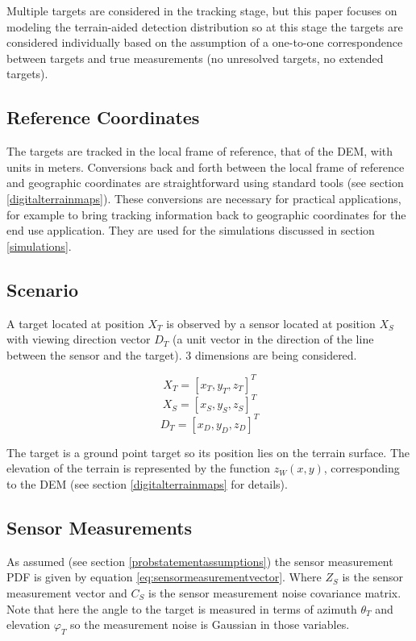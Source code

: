 \documentclass[journal]{IEEEtran}
\begin{document}
Multiple targets are considered in the tracking stage, but this paper focuses on modeling the terrain-aided detection distribution so at this stage the targets are considered individually based on the assumption of a one-to-one correspondence between targets and true measurements (no unresolved targets, no extended targets).

\subsection{Reference Coordinates}
The targets are tracked in the local frame of reference, that of the DEM, with units in meters. Conversions back and forth between the local frame of reference and geographic coordinates are straightforward using standard tools (see section \ref{digitalterrainmaps}). These conversions are necessary for practical applications, for example to bring tracking information back to geographic coordinates for the end use application. They are used for the simulations discussed in section \ref{simulations}.

\subsection{Scenario}
A target located at position $X_T$ is observed by a sensor located at position $X_S$ with viewing direction vector $D_T$ (a unit vector in the direction of the line between the sensor and the target). 3 dimensions are being considered.

\begin{dmath}
    X_T = [x_T, y_T, z_T]^T
\end{dmath}
\begin{dmath}
    X_S = [x_S, y_S, z_S]^T
\end{dmath}
\begin{dmath}
    D_T = [x_D, y_D, z_D]^T
\end{dmath}

The target is a ground point target so its position lies on the terrain surface. The elevation of the terrain is represented by the function $z_{W}(x,y)$, corresponding to the DEM (see section \ref{digitalterrainmaps} for details).

\subsection{Sensor Measurements}
As assumed (see section \ref{probstatementassumptions}) the sensor measurement PDF is given by equation \ref{eq:sensormeasurementvector}. Where $Z_S$ is the sensor measurement vector and $C_S$ is the sensor measurement noise covariance matrix. Note that here the angle to the target is measured in terms of azimuth $\theta_T$ and elevation $\varphi_T$ so the measurement noise is Gaussian in those variables.
\end{document}
